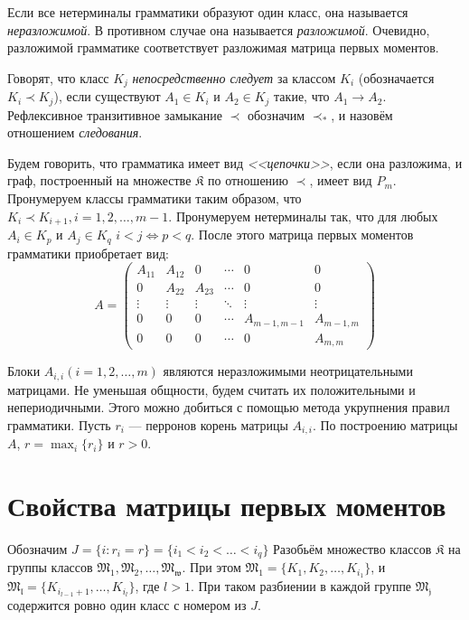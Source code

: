 \documentclass[11pt]{article}
\begin{document}
Если все нетерминалы грамматики образуют один класс, она называется \textit{неразложимой}. В противном случае она называется \textit{разложимой}. Очевидно, разложимой грамматике соответствует разложимая матрица первых моментов.

Говорят, что класс $K_j$ \textit{непосредственно следует} за классом $K_i$ (обозначается $K_i \prec K_j$), если существуют $A_1 \in K_i$ и $A_2 \in K_j$ такие, что $A_1 \rightarrow A_2$. Рефлексивное транзитивное замыкание $\prec$ обозначим $\prec_*$, и назовём отношением \textit{следования}.

Будем говорить, что грамматика имеет вид \textit{<<цепочки>>}, если она разложима, и граф, построенный на множестве $\mathfrak{K}$ по отношению $\prec$, имеет вид $P_m$. Пронумеруем классы грамматики таким образом, что $K_i \prec K_{i+1}, i = 1,2,\ldots,m-1$. Пронумеруем нетерминалы так, что для любых $A_i \in K_p$ и $A_j \in K_q$ $i < j \Leftrightarrow p < q$. После этого матрица первых моментов грамматики приобретает вид:
\begin{equation}
    A = 
    \begin{pmatrix}
        A_{11} & A_{12} & 0 & \cdots & 0 & 0 \\
        0 & A_{22} & A_{23} & \cdots & 0 & 0 \\
        \vdots & \vdots & \vdots & \ddots & \vdots & \vdots \\
        0 & 0 & 0 & \cdots & A_{m-1,m-1} & A_{m-1,m} \\
        0 & 0 & 0 & \cdots & 0 & A_{m,m}
    \end{pmatrix}
\end{equation}

Блоки $A_{i,i} (i = 1,2,\ldots,m)$ являются неразложимыми неотрицательными матрицами. Не уменьшая общности, будем считать их положительными и непериодичными. Этого можно добиться с помощью метода укрупнения правил грамматики. Пусть $r_i$ --- перронов корень матрицы $A_{i,i}$. По построению матрицы $A$, $r = \max_i \{r_i\}$ и $r > 0$.

\section{Свойства матрицы первых моментов}

Обозначим $J = \{ i : r_i = r \} = \{ i_1 < i_2 < \ldots < i_q \}$ Разобьём множество классов $\mathfrak{K}$ на группы классов $\mathfrak{M_1}, \mathfrak{M_2}, \ldots, \mathfrak{M_w}$. При этом $\mathfrak{M_1} = \{K_1, K_2, \ldots, K_{i_1} \}$, и $\mathfrak{M_l} = \{ K_{i_{l-1} + 1}, \ldots, K_{i_l} \}$, где $l > 1$. При таком разбиении в каждой группе $\mathfrak{M_j}$ содержится ровно один класс с номером из $J$.
\end{document}
